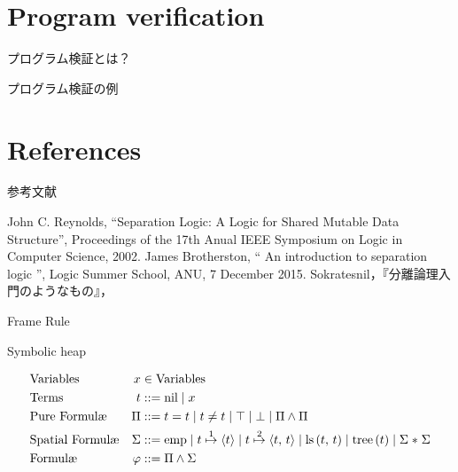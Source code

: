 \documentclass[notheorems, aspectratio=169, 12pt, unicode]{beamer}
\begin{document}
\section{Program verification}

\begin{frame}{プログラム検証とは？}
 
\end{frame}

\begin{frame}{プログラム検証の例}
 
\end{frame}

\section{References}

\begin{frame}{参考文献}
 \begin{thebibliography}{9}
   John C. Reynolds, ``Separation Logic: A Logic for Shared Mutable Data Structure'', Proceedings of the 17th Anual IEEE Symposium on Logic in Computer Science, 2002.
   James Brotherston, 
	  `` An introduction to separation logic '', 
	  Logic Summer School, ANU, 7 December 2015.
 Sokratesnil，『分離論理入門のようなもの』，\url{}
 \end{thebibliography} 
\end{frame}

\appendix

\begin{frame}{Frame Rule}
 
\end{frame}

\begin{frame}{Symbolic heap}
  \begin{definition}
  \minusbaselineskip
  \begin{align*}
   &\text{Variables}  &x &\in \mathVar \\
   &\text{Terms}  &t &::= \mathvalnil \mathrelbar x \\
   &\text{Pure Formul\ae}  &\Pi &::=   t = t  \mathrelbar t \neq t \mathrelbar \top \mathrelbar \bot \mathrelbar \Pi \land \Pi \\
   &\text{Spatial Formul\ae}  &\Sigma &::= \mathemp \mathrelbar \mathpointer{t}{1}{t} \mathrelbar  \mathpointer{t}{2}{t{,}\ t} \mathrelbar  \mathprls{t}{t} \mathrelbar \mathprtree{t} \mathrelbar \Sigma \mathsepstar \Sigma \\
   &\text{Formul\ae}  &\varphi &::=  \Pi \land \Sigma
  \end{align*}
 \end{definition}
\end{frame}
\end{document}

